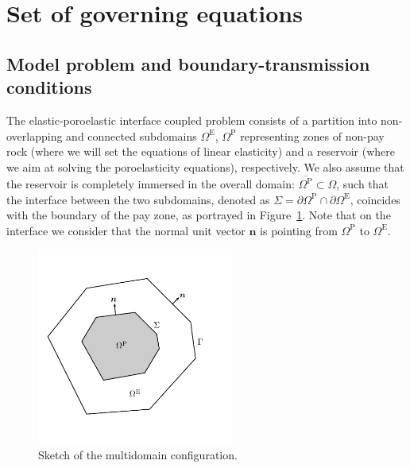 \documentclass[11pt]{article}
\numberwithin{equation}{section}
\newcommand\nn{\boldsymbol{n}}
\newcommand\OmP{\Omega^{\mathrm{P}}}
\newcommand\OmE{\Omega^{\mathrm{E}}}
\numberwithin{equation}{section}
\begin{document}
	\section{Set of governing equations}\label{sec:model}
	\subsection{Model problem and boundary-transmission conditions}
	The elastic-poroelastic interface coupled problem consists of a partition into non-overlapping and connected subdomains
	$\OmE$, $\OmP$ representing zones of non-pay rock (where 
	we will set the equations of linear elasticity) and a reservoir
	(where we aim at solving the poroelasticity 
	equations), respectively. We also assume that the reservoir is
	completely immersed in the overall domain: $\overline{\OmP} \subset  \Omega$, 
	such that the interface between the two subdomains,
	denoted as   $\Sigma=\partial\OmP\cap \partial\OmE$, 
	coincides with the boundary of the  pay zone, as portrayed
	in Figure~\ref{fig:sketch}.  Note that on the interface we consider that 
	the normal unit vector $\nn$ is pointing from $\OmP$ to $\OmE$. 
	
	\begin{figure}
		\begin{center}
			\includegraphics[width=0.575\textwidth]{domain}
		\end{center}
		\caption{Sketch of the multidomain configuration.}\label{fig:sketch}
	\end{figure}
	
\end{document}
